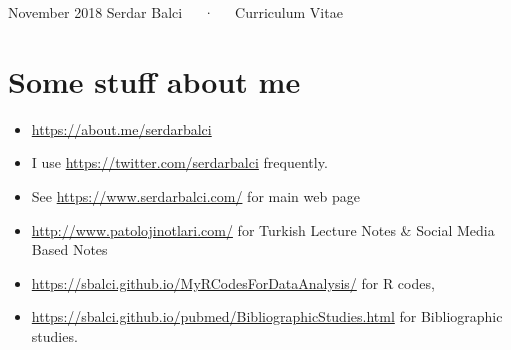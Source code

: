 \documentclass[11pt, a4paper]{awesome-cv}
\providecommand{\tightlist}{%
	\setlength{\itemsep}{0pt}\setlength{\parskip}{0pt}}
\begin{document}
\makecvheader

\makecvfooter
  {November 2018}
  {Serdar Balci~~~·~~~Curriculum Vitae}
  {\thepage}



\hypertarget{some-stuff-about-me}{%
\section{Some stuff about me}\label{some-stuff-about-me}}

\begin{itemize}
\tightlist
\item
  \url{https://about.me/serdarbalci}
\item
  I use \url{https://twitter.com/serdarbalci} frequently.
\item
  See \url{https://www.serdarbalci.com/} for main web page
\item
  \url{http://www.patolojinotlari.com/} for Turkish Lecture Notes \&
  Social Media Based Notes
\item
  \url{https://sbalci.github.io/MyRCodesForDataAnalysis/} for R codes,
\item
  \url{https://sbalci.github.io/pubmed/BibliographicStudies.html} for
  Bibliographic studies.
\end{itemize}

\end{document}
